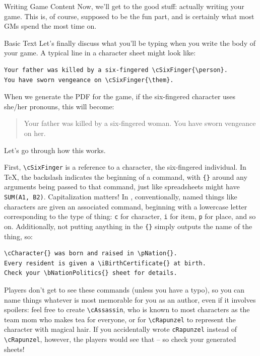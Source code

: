 \documentclass[sheet]{GameTexBase}
\begin{document}
\begin{section}{Writing Game Content}
Now, we'll get to the good stuff: actually writing your game.  This is, of course, supposed to be the fun part, and is certainly what most GMs spend the most time on.

\begin{subsection}{Basic \gametex{} Text}
Let's finally discuss what you'll be typing when you write the body of your game.
A typical line in a \gametex{} character sheet might look like:
\begin{verbatim}
Your father was killed by a six-fingered \cSixFinger{\person}.  
You have sworn vengeance on \cSixFinger{\them}.
\end{verbatim}

When we generate the PDF for the game, if the six-fingered character uses she/her pronouns, this will become:

\begin{quote}
Your father was killed by a six-fingered woman.  You have sworn vengeance on her.
\end{quote}
Let's go through how this works.

First, \lstinline{\cSixFinger} is a reference to a character, the six-fingered individual.  In \TeX{}, the backslash indicates the beginning of a command, with \lstinline|{}| around any arguments being passed to that command, just like spreadsheets might have \texttt{SUM(A1, B2)}.  Capitalization matters!  In \gametex{}, conventionally, named things like characters are given an associated command, beginning with a lowercase letter corresponding to the type of thing: \lstinline{c} for character, \lstinline{i} for item, \lstinline{p} for place, and so on.  Additionally, not putting anything in the \lstinline|{}| simply outputs the name of the thing, so: 
\begin{verbatim}
\cCharacter{} was born and raised in \pNation{}.
Every resident is given a \iBirthCertificate{} at birth.
Check your \bNationPolitics{} sheet for details.
\end{verbatim}

Players don't get to see these commands (unless you have a typo), so you can name things whatever is most memorable for you as an author, even if it involves spoilers: feel free to create \lstinline|\cAssassin|, who is known to most characters as the team mom who makes tea for everyone, or for \lstinline{\cRapunzel} to represent the character with magical hair.  If you accidentally wrote \lstinline{cRapunzel} instead of \lstinline{\cRapunzel}, however, the players would see that -- so check your generated sheets!


\end{subsection}
\end{section}
\end{document}

